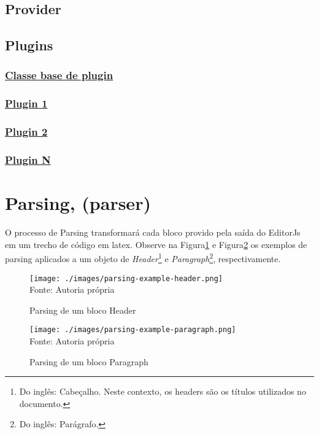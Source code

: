 \subsection{Provider}

\subsection{Plugins}

\subsubsection{\underline{Classe base de plugin}}

\subsubsection{\underline{Plugin 1}}

\subsubsection{\underline{Plugin 2}}

\subsubsection{\underline{Plugin N}}

\section{Parsing, (parser)}

O processo de Parsing transformará cada bloco provido
pela saída do EditorJs em um trecho de código em
\acrshort{latex}.
Observe na
Figura\ref{fig:parsing-example-header}                
e
Figura\ref{fig:parsing-example-paragraph}
os exemplos de parsing aplicados a um objeto de
\textit{Header}\footnote{Do inglês: Cabeçalho. Neste contexto, os headers são os títulos utilizados no documento.
}
e
\textit{Paragraph}\footnote{Do inglês: Parágrafo.
},
respectivamente.

\begin{figure}[H]
    \centering
    \caption{Parsing de um bloco Header}
    \texttt{[image: ./images/parsing-example-header.png]}
    \label{fig:parsing-example-header} \\
    \textnormal{\fontsize{10pt}{12pt}Fonte: Autoria própria}
\end{figure}

\begin{figure}[H]
    \centering
    \caption{Parsing de um bloco Paragraph}
    \texttt{[image: ./images/parsing-example-paragraph.png]}
    \label{fig:parsing-example-paragraph} \\
    \textnormal{\fontsize{10pt}{12pt}Fonte: Autoria própria}
\end{figure}

